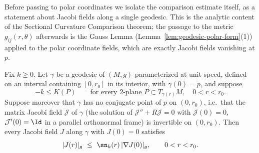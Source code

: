 Before passing to polar coordinates we isolate the comparison estimate
itself, as a statement about Jacobi fields along a single geodesic.  This
is the analytic content of the Sectional Curvature Comparison theorem; the
passage to the metric $g_{ij}(r,\theta)$ afterwards is the Gauss Lemma
(Lemma~\ref{lem:geodesic-polar-form}(1)) applied to the polar coordinate
fields, which are exactly Jacobi fields vanishing at $p$.

\begin{lemma}
\label{lem:jacobi-metric-comparison}
\leanok
Fix $k\ge 0$. Let $\gamma$ be a geodesic of $(M,g)$ parameterized at unit
speed, defined on an interval containing $[0,r_0]$ in its interior, with
$\gamma(0)=p$, and suppose
$$-k\le K(P)\qquad\text{for every $2$-plane }P\subset T_{\gamma(r)}M,\quad
0<r<r_0.$$
Suppose moreover that $\gamma$ has no conjugate point of $p$ on $(0,r_0)$,
i.e.\ that the matrix Jacobi field $\mathcal J$ of $\gamma$ (the solution of
$\mathcal J''+R\mathcal J=0$ with $\mathcal J(0)=0$, $\mathcal J'(0)=\Id$ in a
parallel orthonormal frame) is invertible on $(0,r_0)$. Then every Jacobi
field $J$ along $\gamma$ with $J(0)=0$ satisfies
$$|J(r)|_g\ \le\ \sn_k(r)\,|\nabla J(0)|_g,\qquad 0<r<r_0.$$
\end{lemma}

